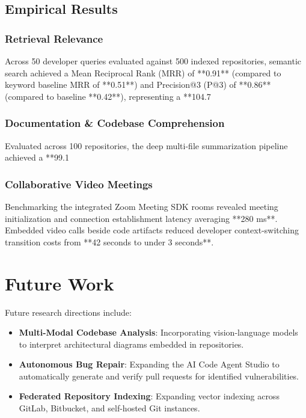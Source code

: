 \documentclass[journal]{IEEEtran}
\begin{document}
\subsection{Empirical Results}

\subsubsection{Retrieval Relevance}
Across 50 developer queries evaluated against 500 indexed repositories, semantic search achieved a Mean Reciprocal Rank (MRR) of **0.91** (compared to keyword baseline MRR of **0.51**) and Precision@3 (P@3) of **0.86** (compared to baseline **0.42**), representing a **104.7%

\subsubsection{Documentation & Codebase Comprehension}
Evaluated across 100 repositories, the deep multi-file summarization pipeline achieved a **99.1%

\subsubsection{Collaborative Video Meetings}
Benchmarking the integrated Zoom Meeting SDK rooms revealed meeting initialization and connection establishment latency averaging **280 ms**. Embedded video calls beside code artifacts reduced developer context-switching transition costs from **42 seconds to under 3 seconds**.

\section{Future Work}
\label{sec:future}

Future research directions include:
\begin{itemize}
    \item \textbf{Multi-Modal Codebase Analysis}: Incorporating vision-language models to interpret architectural diagrams embedded in repositories.
    \item \textbf{Autonomous Bug Repair}: Expanding the AI Code Agent Studio to automatically generate and verify pull requests for identified vulnerabilities.
    \item \textbf{Federated Repository Indexing}: Expanding vector indexing across GitLab, Bitbucket, and self-hosted Git instances.
\end{itemize}
\end{document}
